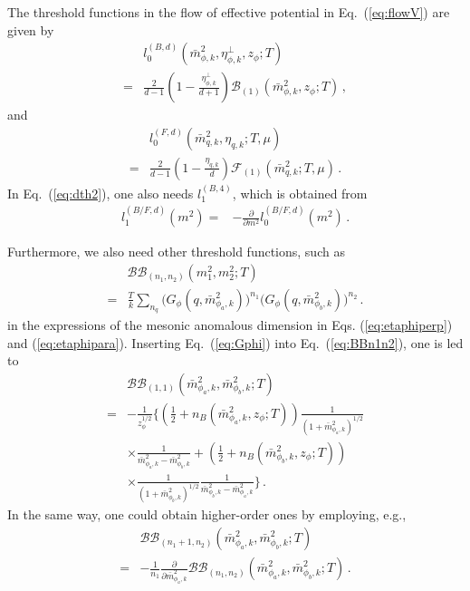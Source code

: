 \documentclass[%
reprint,
superscriptaddress,
showpacs,preprintnumbers,
 amsmath,amssymb,
 aps,
prd,
]{revtex4-1}
\def\Eq#1{Eq.~(\ref{#1})}
\begin{document}
The threshold functions in the flow of effective potential in \Eq{eq:flowV} are given by
\begin{align}
  &l_0^{(B,d)}(\bar{m}^{2}_{\phi,k},\eta^\perp_{\phi,k},z_\phi;T)\nonumber\\[2ex]
  =&\frac{2}{d-1}\left( 1- \frac{\eta^{\bot}_{\phi,k}}{d+1}\right)\mathcal{B}_{(1)}(\bar{m}^{2}_{\phi,k},z_\phi;T)\,,\label{eq:l0B}
\end{align} 
and
\begin{align}
  &l_0^{(F,d)}(\bar{m}^{2}_{q,k},\eta_{q,k};T,\mu)\nonumber\\[2ex]
  =&\frac{2}{d-1}\left( 1-\frac{\eta_{q,k}}{d} \right)\mathcal{F}_{(1)}(\bar{m}^{2}_{q,k};T,\mu)\,.\label{eq:l0F}
\end{align} 
In \Eq{eq:dth2}, one also needs $l^{(B,4)}_{1}$, which is obtained from 
\begin{align}
  l_1^{(B/F,d)}(m^{2})=&-\frac{\partial}{\partial m^{2}}l_0^{(B/F,d)}(m^{2})\,.\label{}
\end{align} 

Furthermore, we also need other threshold functions, such as
\begin{align}
  &\mathcal{BB}_{(n_1,n_2)}(m_1^2,m_2^2;T)\nonumber\\[2ex]
=&\frac{T}{k}\sum_{n_q}\Big(G_\phi(q,\bar{m}^{2}_{\phi_a,k})\Big)^{n_1} \Big(G_\phi(q,\bar{m}^{2}_{\phi_b,k})\Big)^{n_2}\,.\label{eq:BBn1n2}
\end{align}
in the expressions of the mesonic anomalous dimension in Eqs. (\ref{eq:etaphiperp}) and (\ref{eq:etaphipara}). Inserting \Eq{eq:Gphi} into \Eq{eq:BBn1n2}, one is led to
\begin{align}
  &\mathcal{BB}_{(1,1)}(\bar{m}^{2}_{\phi_a,k},\bar{m}^{2}_{\phi_b,k};T)\nonumber\\[2ex]
  =&-\frac{1}{z^{1/2}_{\phi}}\Bigg\{\left(\frac{1}{2}+n_B(\bar{m}^{2}_{\phi_a,k},z_\phi;T) \right)\frac{1}{(1+\bar{m}^{2}_{\phi_a,k})^{1/2}} \nonumber\\[2ex]
&\times \frac{1}{\bar{m}^{2}_{\phi_a,k}-\bar{m}^{2}_{\phi_b,k}}+\left( \frac{1}{2}+n_B(\bar{m}^{2}_{\phi_b,k},z_\phi;T) 
\right)\nonumber\\[2ex]
&\times \frac{1}{(1+\bar{m}^{2}_{\phi_b,k})^{1/2}}\frac{1}{\bar{m}^{2}_{\phi_b,k}-\bar{m}^{2}_{\phi_a,k}}\Bigg\}\,.\label{eq:BB11}
\end{align} 
In the same way, one could obtain higher-order ones by employing, e.g.,
\begin{align}
  &\mathcal{BB}_{(n_1+1,n_2)}(\bar{m}^{2}_{\phi_a,k},\bar{m}^{2}_{\phi_b,k};T)\nonumber\\[2ex]
  =&-\frac{1}{n_1}\frac{\partial}{\partial \bar{m}^{2}_{\phi_a,k}}\mathcal{BB}_{(n_1,n_2)}(\bar{m}^{2}_{\phi_a,k},\bar{m}^{2}_{\phi_b,k};T)\,.
\end{align}
\end{document}
